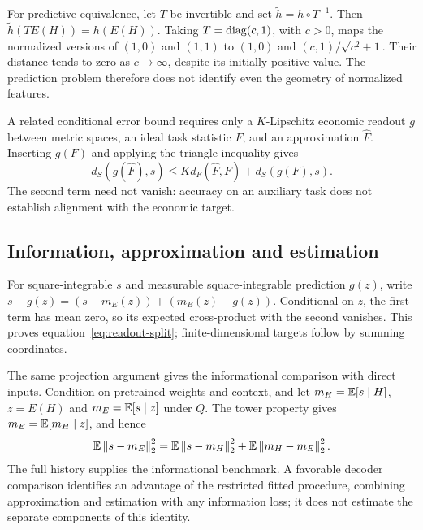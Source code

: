 \documentclass[11pt]{article}
\renewcommand{\lean}[1]{\ignorespaces}
\renewcommand{\leanok}{\ignorespaces}
\begin{document}
For predictive equivalence, let $T$ be invertible and set
$\widetilde h=h\circ T^{-1}$. Then
$\widetilde h(T E(H))=h(E(H))$.
Taking $T=\operatorname{diag}(c,1)$, with $c>0$, maps the normalized versions of $(1,0)$ and
$(1,1)$ to $(1,0)$ and $(c,1)/\sqrt{c^2+1}$. Their distance tends to zero as
$c\to\infty$, despite its initially positive value. The prediction problem
therefore does not identify even the geometry of normalized features.

A related conditional error bound requires only a $K$-Lipschitz economic readout
$g$ between metric spaces, an ideal task statistic $F$, and an approximation
$\widehat F$. Inserting $g(F)$ and applying the triangle inequality gives
\begin{equation}\label{eq:measurement}
  d_S(g(\widehat F),s)
  \le Kd_F(\widehat F,F)+d_S(g(F),s).
\end{equation}
\lean{FreeFoundations.Measurement.measurement_error}\leanok{}
The second term need not vanish: accuracy on an auxiliary task does
not establish
alignment with the economic target.

\subsection{Information, approximation and estimation}
For square-integrable $s$ and measurable square-integrable prediction $g(z)$,
write $s-g(z)=(s-m_E(z))+(m_E(z)-g(z))$. Conditional on $z$, the first term has
mean zero, so its expected cross-product with the second vanishes. This proves
equation~\eqref{eq:readout-split}; finite-dimensional targets follow by summing
coordinates.
\lean{FreeFoundations.Recovery.excess_risk_condExp_vector}\leanok{}

The same projection argument gives the informational comparison with direct
inputs. Condition on pretrained weights and context, and let
$m_H=\mathbb{E}[s\mid H]$, $z=E(H)$ and $m_E=\mathbb{E}[s\mid z]$ under $Q$.
The tower property gives $m_E=\mathbb{E}[m_H\mid z]$, and hence
\[
  \mathbb{E}\left\lVert s-m_E\right\rVert_2^2
  =\mathbb{E}\left\lVert s-m_H\right\rVert_2^2+\mathbb{E}\left\lVert m_H-m_E\right\rVert_2^2.
\]
The full history supplies the informational benchmark. A favorable decoder
comparison identifies an advantage of the restricted fitted procedure,
combining approximation and estimation with any information loss; it does not
estimate the separate components of this identity.
\end{document}
